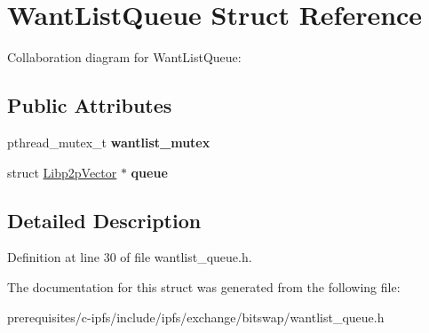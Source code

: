 \hypertarget{struct_want_list_queue}{}\section{Want\+List\+Queue Struct Reference}
\label{struct_want_list_queue}


Collaboration diagram for Want\+List\+Queue\+:
\subsection*{Public Attributes}
\begin{DoxyCompactItemize}
\item 
\mbox{\label{struct_want_list_queue_a85e7b9f46187ac57c27f7c605ed63286}} 
pthread\+\_\+mutex\+\_\+t {\bfseries wantlist\+\_\+mutex}
\item 
\mbox{\label{struct_want_list_queue_a8f5a531d378f7eac0304eb4a4b68bca9}} 
struct \mbox{\hyperlink{struct_libp2p_vector}{Libp2p\+Vector}} $\ast$ {\bfseries queue}
\end{DoxyCompactItemize}


\subsection{Detailed Description}


Definition at line 30 of file wantlist\+\_\+queue.\+h.



The documentation for this struct was generated from the following file\+:\begin{DoxyCompactItemize}
\item 
prerequisites/c-\/ipfs/include/ipfs/exchange/bitswap/wantlist\+\_\+queue.\+h\end{DoxyCompactItemize}

